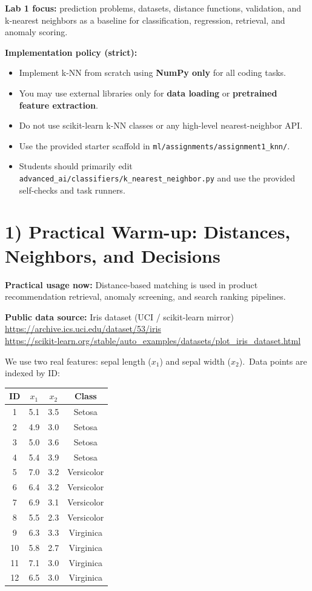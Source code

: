 \textbf{Lab 1 focus:} prediction problems, datasets, distance functions, validation, and k-nearest neighbors as a baseline for classification, regression, retrieval, and anomaly scoring.

\medskip
\textbf{Implementation policy (strict):}
\begin{itemize}
  \item Implement k-NN from scratch using \textbf{NumPy only} for all coding tasks.
  \item You may use external libraries only for \textbf{data loading} or \textbf{pretrained feature extraction}.
  \item Do not use scikit-learn k-NN classes or any high-level nearest-neighbor API.
  \item Use the provided starter scaffold in \texttt{ml/assignments/assignment1\_knn/}.
  \item Students should primarily edit \texttt{advanced\_ai/classifiers/k\_nearest\_neighbor.py} and use the provided self-checks and task runners.
\end{itemize}

\section*{1) Practical Warm-up: Distances, Neighbors, and Decisions}
\textbf{Practical usage now:} Distance-based matching is used in product recommendation retrieval, anomaly screening, and search ranking pipelines.

\medskip
\textbf{Public data source:} Iris dataset (UCI / scikit-learn mirror)\\
\url{https://archive.ics.uci.edu/dataset/53/iris}\\
\url{https://scikit-learn.org/stable/auto_examples/datasets/plot_iris_dataset.html}

\medskip
We use two real features: sepal length ($x_1$) and sepal width ($x_2$).\
Data points are indexed by ID:

\begin{center}
\begin{tabular}{cccc}
\toprule
ID & $x_1$ & $x_2$ & Class \\
\midrule
1 & 5.1 & 3.5 & Setosa \\
2 & 4.9 & 3.0 & Setosa \\
3 & 5.0 & 3.6 & Setosa \\
4 & 5.4 & 3.9 & Setosa \\
5 & 7.0 & 3.2 & Versicolor \\
6 & 6.4 & 3.2 & Versicolor \\
7 & 6.9 & 3.1 & Versicolor \\
8 & 5.5 & 2.3 & Versicolor \\
9 & 6.3 & 3.3 & Virginica \\
10 & 5.8 & 2.7 & Virginica \\
11 & 7.1 & 3.0 & Virginica \\
12 & 6.5 & 3.0 & Virginica \\
\bottomrule
\end{tabular}
\end{center}

